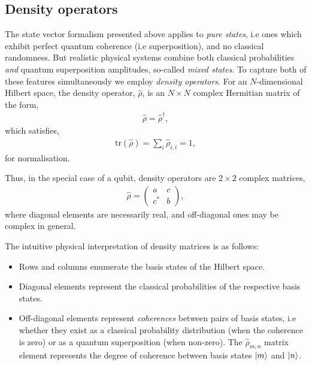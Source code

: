 %
%

\subsection{Density operators}

The state vector formalism presented above applies to \textit{pure states}, i.e ones which exhibit perfect quantum coherence (i.e superposition), and no classical randomness. But realistic physical systems combine both classical probabilities \textit{and} quantum superposition amplitudes, so-called \textit{mixed states}. To capture both of these features simultaneously we employ \textit{density operators}. For an $N$-dimensional Hilbert space, the density operator, $\hat\rho$, is an \mbox{$N\times N$} complex Hermitian matrix of the form,
\begin{align}
	\hat\rho = \hat\rho^\dag,
\end{align}
which satisfies,
\begin{align}
\mathrm{tr}(\hat\rho)=\sum_i \hat\rho_{i,i} = 1,	
\end{align}
for normalisation.

Thus, in the special case of a qubit, density operators are \mbox{$2\times 2$} complex matrices,
\begin{align}\label{eq:2x2density}
\hat\rho = \left(\begin{matrix}{}
  a & c \\
  c^* & b
\end{matrix}\right),
\end{align}
where diagonal elements are necessarily real, and off-diagonal ones may be complex in general.

The intuitive physical interpretation of density matrices is as follows:
\begin{itemize}
\item Rows and columns enumerate the basis states of the Hilbert space.
\item Diagonal elements represent the classical probabilities of the respective basis states.
\item Off-diagonal elements represent \textit{coherences} between pairs of basis states, i.e whether they exist as a classical probability distribution (when the coherence is zero) or as a quantum superposition (when non-zero). The $\hat\rho_{m,n}$ matrix element represents the degree of coherence between basis states $|m\rangle$ and $|n\rangle$.
\end{itemize}

